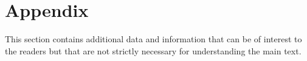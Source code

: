 \appendix
\section{Appendix}
This section contains additional data and information that can be of interest to the readers but that are not strictly necessary for understanding the main text.







